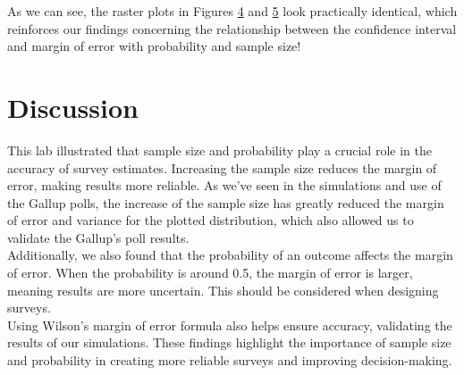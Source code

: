 \documentclass{article}\usepackage[]{graphicx}\usepackage[]{xcolor}
\begin{document}
\begin{multicols}{2}
As we can see, the raster plots in Figures \hyperref[fig4]{4} and \hyperref[fig5]{5} look practically identical, which reinforces our findings concerning the relationship between the confidence interval and margin of error with probability and sample size!

\section{Discussion}
This lab illustrated that sample size and probability play a crucial role in the accuracy of survey estimates. Increasing the sample size reduces the margin of error, making results more reliable. As we've seen in the simulations and use of the Gallup polls, the increase of the sample size has greatly reduced the margin of error and variance for the plotted distribution, which also allowed us to validate the Gallup's poll results. \\
Additionally, we also found that the probability of an outcome affects the margin of error. When the probability is around 0.5, the margin of error is larger, meaning results are more uncertain. This should be considered when designing surveys. \\
Using Wilson’s margin of error formula also helps ensure accuracy, validating the results of our simulations. These findings highlight the importance of sample size and probability in creating more reliable surveys and improving decision-making.




\begin{tiny}

\end{tiny}
\end{multicols}
\end{document}
